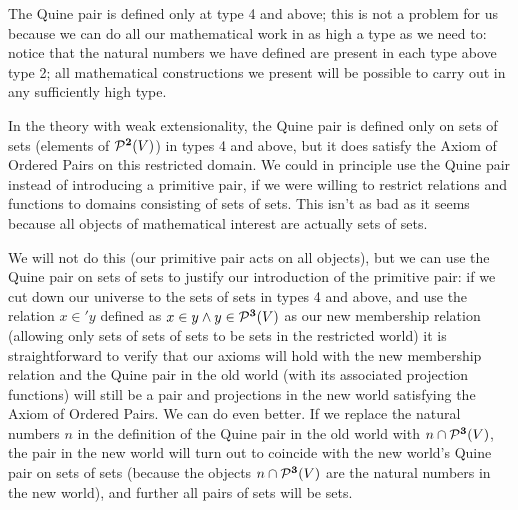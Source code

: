 \documentclass[12pt]{book}
\begin{document}
The Quine pair is defined only at type 4 and above; this is not a
problem for us because we can do all our mathematical work in as high
a type as we need to: notice that the natural numbers we have defined
are present in each type above type 2; all mathematical constructions
we present will be possible to carry out in any sufficiently high
type.

In the theory with weak extensionality, the Quine pair is defined only
on sets of sets (elements of ${\cal P}^{\bf 2}(V)$) in types 4 and above,
but it does satisfy the Axiom of Ordered Pairs on this restricted
domain.  We could in principle use the Quine pair instead of
introducing a primitive pair, if we were willing to restrict
relations and functions to domains consisting of sets of sets.  This
isn't as bad as it seems because all objects of mathematical interest
are actually sets of sets.

 We will not do this (our primitive pair
acts on all objects), but we can use the Quine pair on sets of sets to
justify our introduction of the primitive pair: if we cut down our
universe to the sets of sets in types 4 and above, and use the
relation $x \in' y$ defined as $x\in y \wedge y \in {\cal P}^{\bf 3}(V)$ as
our new membership relation (allowing only sets of sets of sets to be
sets in the restricted world) it is straightforward to verify that our
axioms will hold with the new membership relation and the Quine pair
in the old world (with its associated projection functions) will still
be a pair and projections in the new world satisfying the Axiom of
Ordered Pairs.  We can do even better.  If we replace the natural
numbers $n$ in the definition of the Quine pair in the old world with
$n \cap {\cal P}^{\bf 3}(V)$, the pair in the new world will turn out to
coincide with the new world's Quine pair on sets of sets (because the
objects $n \cap {\cal P}^{\bf 3}(V)$ are the natural numbers in the new
world), and further all pairs of sets will be sets.
\end{document}
